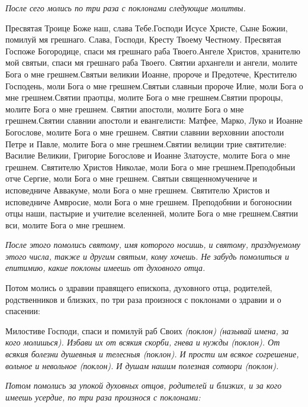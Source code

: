 \medskip


\itshape После сего молись по три раза с поклонами следующие молитвы.\normalfont{}


Пресвятая Троице Боже наш, слава Тебе.Господи Исусе Христе, Сыне Божии, помилуй мя грешнаго. Слава, Господи, Кресту Твоему Честному. Пресвятая Госпоже Богородице, спаси мя грешнаго раба Твоего.Ангеле Христов, хранителю мой святыи, спаси мя грешнаго раба Твоего. Святии архангели и ангели, молите Бога о мне грешнем.Святыи великии Иоанне, пророче и Предотече, Крестителю Господень, моли Бога о мне грешнем.Святыи славныи пророче Илие, моли Бога о мне грешнем.Святии праотцы, молите Бога о мне грешнем.Святии пророцы, молите Бога о мне грешнем. Святии апостоли, молите Бога о мне грешнем.Святии славнии апостоли и евангелисти: Матфее, Марко, Луко и Иоанне Богослове, молите Бога о мне грешнем. Святии славнии верховнии апостоли Петре и Павле, молите Бога о мне грешнем.Святии велиции трие святителие: Василие Великии, Григорие Богослове и Иоанне Златоусте, молите Бога о мне грешнем. Святителю Христов Николае, моли Бога о мне грешнем.Преподобныи отче Сергие, моли Бога о мне грешнем. Святыи священномучениче и исповедниче Аввакуме, моли Бога о мне грешнем. Святителю Христов и исповедниче Амвросие, моли Бога о мне грешнем. Преподобнии и богоноснии отцы наши, пастырие и учителие вселенней, молите Бога о мне грешнем.Святии вси, молите Бога о мне грешнем.


\itshape После этого помолись святому, имя которого носишь, и святому, празднуемому этого числа, также и другим святым, кому хочешь. Не забудь помолиться и епитимию, какие поклоны имеешь от духовного отца.\normalfont{}


\medskip


Потом молись о здравии правящего епископа, духовного отца, родителей, родственников и близких, по три раза произнося с поклонами о здравии и о спасении: 


\medskip


Милостиве Господи, спаси и помилуй раб Своих \itshape (поклон) (называй имена, за кого молишься)\normalfont{}. Избави их от всякия скорби, гнева и нужды \itshape (поклон)\normalfont{}. От всякия болезни душевныя и телесныя \itshape (поклон)\normalfont{}. И прости им всякое согрешение, вольное и невольное (поклон). И душам нашим полезная сотвори \itshape (поклон)\normalfont{}. 


\medskip


\itshape Потом помолись за упокой духовных отцов, родителей и близких, и за кого имеешь усердие, по три раза произнося с поклонами: \normalfont{}


